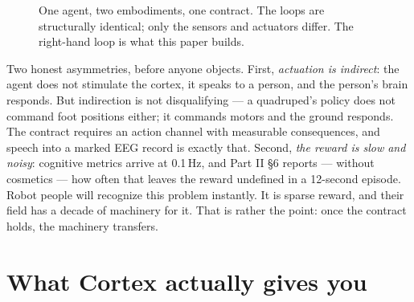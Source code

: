 \documentclass{article}
\begin{document}
\begin{figure}[h]
\centering
{}
\caption{One agent, two embodiments, one contract. The loops are structurally identical; only the sensors and actuators differ. The right-hand loop is what this paper builds.}
\label{fig:contract}
\end{figure}

Two honest asymmetries, before anyone objects. First, \emph{actuation is indirect}: the agent does not stimulate the cortex, it speaks to a person, and the person's brain responds. But indirection is not disqualifying --- a quadruped's policy does not command foot positions either; it commands motors and the ground responds. The contract requires an action channel with measurable consequences, and speech into a marked EEG record is exactly that. Second, \emph{the reward is slow and noisy}: cognitive metrics arrive at 0.1\,Hz, and Part II \S6 reports --- without cosmetics --- how often that leaves the reward undefined in a 12-second episode. Robot people will recognize this problem instantly. It is sparse reward, and their field has a decade of machinery for it. That is rather the point: once the contract holds, the machinery transfers.

\section{What Cortex actually gives you}
\label{sec:cortex}
\end{document}
